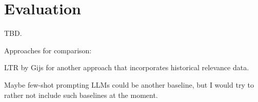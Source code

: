 \section{Evaluation}

TBD.

Approaches for comparison:

LTR by Gijs for another approach that incorporates historical relevance data.

Maybe few-shot prompting LLMs could be another baseline, but I would try to rather not include such baselines at the moment.

